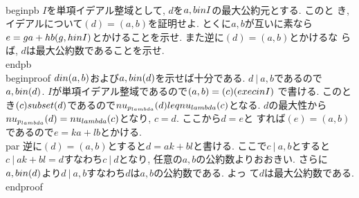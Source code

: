 \\begin{pb}
 $I$を単項イデアル整域として, $d$を$a, b\\in I$の最大公約元とする. このと
 き, イデアルについて$(d)=(a, b)$を証明せよ. とくに$a, b$が互いに素なら
 $e=ga+hb(g, h\\in I)$とかけることを示せ. また逆に$(d)=(a, b)$とかけるな
 らば, $d$は最大公約数であることを示せ.
\\end{pb}
\\begin{proof}
 $d\\in (a, b)$および$a, b\\in (d)$を示せば十分である. $d~|~a, b$であるので
 $a, b\\in (d)$. $I$が単項イデアル整域であるので$(a, b)=(c)(\\exe c\\in I)$
 で書ける. このとき$(c)\\subset (d)$であるので$\\nu_{p_{\\lambda}}(d)\\leq
 \\nu_{\\lambda} (c)$となる. $d$の最大性から
 $\\nu_{p_{\\lambda}}(d)=\\nu_{\\lambda} (c)$となり, $c=d$. ここから$d=e$と
 すれば$(e)=(a, b)$であるので$e=ka+lb$とかける.
 \\par 逆に$(d)=(a, b)$とすると$d=ak+bl$と書ける. ここで$c~|~a, b$とすると
 $c~|~ak+bl=d$すなわち$c~|~d$となり, 任意の$a, b$の公約数よりおおきい.
 さらに$a, b\\in (d)$より$d~|~a, b$すなわち$d$は$a, b$の公約数である. よっ
 て$d$は最大公約数である.
\\end{proof}

